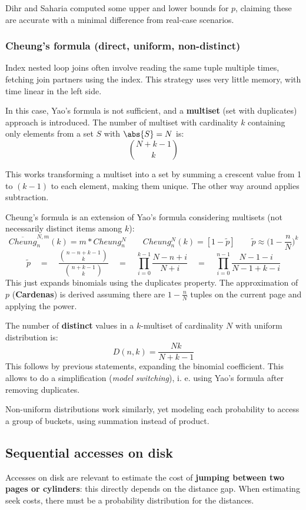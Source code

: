 Dihr and Saharia computed some upper and lower bounds for $p$, claiming these are accurate with a minimal difference from real-case scenarios.

\subsubsection{Cheung's formula (direct, uniform, non-distinct)}
Index nested loop joins often involve reading the same tuple multiple times, fetching join partners using the index. This strategy uses very little memory, with time linear in the left side.

In this case, Yao's formula is not sufficient, and a \textbf{multiset} (set with duplicates) approach is introduced. The number of multiset with cardinality $k$ containing only elements from a set $S$ with $\abs{S} = N$ is:
$${N+k-1}\choose{k}$$

This works transforming a multiset into a set by summing a crescent value from 1 to $(k-1)$ to each element, making them unique. The other way around applies subtraction. 

Cheung's formula is an extension of Yao's formula considering multisets (not necessarily distinct items among $k$):
$$\overline{Cheung}^{N, m}_n(k) = m * Cheung^N_n \qquad Cheung^N_n(k) = [1 - \tilde{p}] \qquad \tilde{p} \approx \Big( 1 - \frac{n}{N}\Big)^k$$
$$\tilde{p} \quad = \quad \frac{{n-n+k-1\choose k}}{{n+k-1\choose k}} \quad = \quad \prod_{i=0}^{k-1} \frac{N-n+i}{N+i} \quad = \quad \prod_{i=0}^{n-1} \frac{N-1-i}{N-1+k-i}$$
This just expands binomials using the duplicates property. The approximation of $p$ (\textbf{Cardenas}) is derived assuming there are $1 - \frac{n}{N}$ tuples on the current page and applying the power.

The number of \textbf{distinct} values in a $k$-multiset of cardinality $N$ with uniform distribution is:
$$D(n, k) = \frac{Nk}{N + k - 1}$$
This follows by previous statements, expanding the binomial coefficient. This allows to do a simplification (\textit{model switching}), i. e. using Yao's formula after removing duplicates. 

Non-uniform distributions work similarly, yet modeling each probability to access a group of buckets, using summation instead of product. 

\subsection{Sequential accesses on disk}
Accesses on disk are relevant to estimate the cost of \textbf{jumping between two pages or cylinders}: this directly depends on the distance gap. When estimating seek costs, there must be a probability distribution for the distances.  

